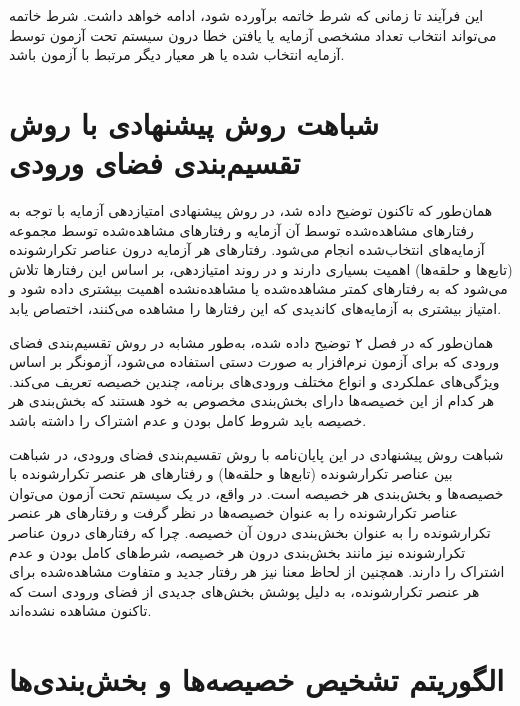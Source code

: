 این فرآیند تا زمانی که شرط خاتمه برآورده شود، ادامه خواهد داشت. شرط خاتمه می‌تواند انتخاب تعداد مشخصی آزمایه یا یافتن خطا درون  سیستم تحت آزمون توسط آزمایه انتخاب شده یا هر معیار دیگر مرتبط با آزمون باشد.



\section{شباهت روش پیشنهادی با روش تقسیم‌بندی فضای ورودی}

همان‌طور که تاکنون توضیح داده شد، در روش پیشنهادی امتیازدهی آزمایه با توجه به رفتارهای مشاهده‌شده توسط آن آزمایه و رفتارهای مشاهده‌شده توسط مجموعه آزمایه‌های انتخاب‌شده انجام می‌شود. رفتارهای هر آزمایه درون عناصر تکرارشونده (تابع‌ها و حلقه‌ها) اهمیت بسیاری دارند و در روند امتیازدهی، بر اساس این رفتارها تلاش می‌شود که به رفتارهای کمتر مشاهده‌شده یا مشاهده‌نشده اهمیت بیشتری داده شود و امتیاز بیشتری به آزمایه‌های کاندیدی که این رفتارها را مشاهده می‌کنند، اختصاص یابد.

همان‌طور که در فصل ۲ توضیح داده شده، به‌طور مشابه در روش تقسیم‌بندی فضای ورودی که برای آزمون نرم‌افزار به صورت دستی استفاده می‌شود، آزمونگر بر اساس ویژگی‌های عملکردی و انواع مختلف ورودی‌های برنامه، چندین خصیصه تعریف می‌کند. هر کدام از این خصیصه‌ها دارای بخش‌بندی مخصوص به خود هستند که بخش‌بندی هر خصیصه باید شروط کامل بودن و عدم اشتراک را داشته باشد.

شباهت روش پیشنهادی در این پایان‌نامه با روش تقسیم‌بندی فضای ورودی، در شباهت بین عناصر تکرارشونده (تابع‌ها و حلقه‌ها) و رفتارهای هر عنصر تکرارشونده با خصیصه‌ها و بخش‌بندی هر خصیصه است. در واقع، در یک سیستم تحت آزمون می‌توان عناصر تکرارشونده را به عنوان خصیصه‌ها در نظر گرفت و رفتارهای هر عنصر تکرارشونده را به عنوان بخش‌بندی درون آن خصیصه. چرا که رفتارهای درون عناصر تکرارشونده نیز مانند بخش‌بندی درون هر خصیصه، شرط‌های کامل بودن و عدم اشتراک را دارند. همچنین از لحاظ معنا نیز هر رفتار جدید و متفاوت مشاهده‌شده برای هر عنصر تکرارشونده، به دلیل پوشش بخش‌های جدیدی از فضای ورودی است که تاکنون مشاهده نشده‌اند.



\section{الگوریتم تشخیص خصیصه‌ها و بخش‌بندی‌ها}

